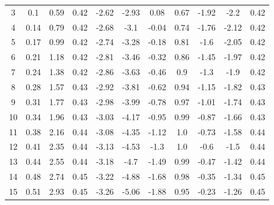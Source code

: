 \begin{table}
{\begin{tabular}{c|cc|cccccccc}
3 & 0.1 & 0.59 & 0.42 & -2.62 & -2.93 & 0.08 & 0.67 & -1.92 & -2.2 & 0.42\\ 
4 & 0.14 & 0.79 & 0.42 & -2.68 & -3.1 & -0.04 & 0.74 & -1.76 & -2.12 & 0.42\\ 
5 & 0.17 & 0.99 & 0.42 & -2.74 & -3.28 & -0.18 & 0.81 & -1.6 & -2.05 & 0.42\\ 
6 & 0.21 & 1.18 & 0.42 & -2.81 & -3.46 & -0.32 & 0.86 & -1.45 & -1.97 & 0.42\\ 
7 & 0.24 & 1.38 & 0.42 & -2.86 & -3.63 & -0.46 & 0.9 & -1.3 & -1.9 & 0.42\\ 
8 & 0.28 & 1.57 & 0.43 & -2.92 & -3.81 & -0.62 & 0.94 & -1.15 & -1.82 & 0.43\\ 
9 & 0.31 & 1.77 & 0.43 & -2.98 & -3.99 & -0.78 & 0.97 & -1.01 & -1.74 & 0.43\\ 
10 & 0.34 & 1.96 & 0.43 & -3.03 & -4.17 & -0.95 & 0.99 & -0.87 & -1.66 & 0.43\\ 
11 & 0.38 & 2.16 & 0.44 & -3.08 & -4.35 & -1.12 & 1.0 & -0.73 & -1.58 & 0.44\\ 
12 & 0.41 & 2.35 & 0.44 & -3.13 & -4.53 & -1.3 & 1.0 & -0.6 & -1.5 & 0.44\\ 
13 & 0.44 & 2.55 & 0.44 & -3.18 & -4.7 & -1.49 & 0.99 & -0.47 & -1.42 & 0.44\\ 
14 & 0.48 & 2.74 & 0.45 & -3.22 & -4.88 & -1.68 & 0.98 & -0.35 & -1.34 & 0.45\\ 
15 & 0.51 & 2.93 & 0.45 & -3.26 & -5.06 & -1.88 & 0.95 & -0.23 & -1.26 & 0.45\\ 

\end{tabular}
}
\end{table}

